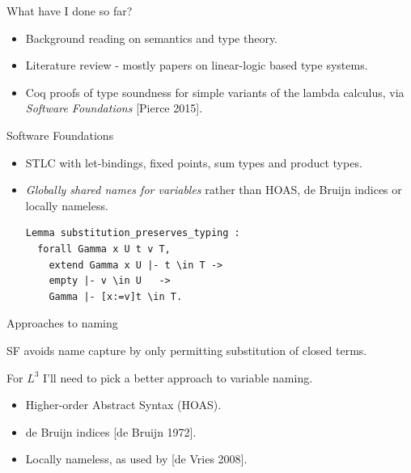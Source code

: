 \documentclass[10pt]{beamer}
\begin{document}
\begin{frame}{What have I done so far?}

\begin{itemize}
\item Background reading on semantics and type theory.
\item Literature review - mostly papers on linear-logic based type systems.
\item Coq proofs of type soundness for simple variants of the lambda calculus, via \textit{Software Foundations} [Pierce 2015].
\end{itemize}
\end{frame}

\begin{frame}[fragile]{Software Foundations}

\begin{itemize}
\item STLC with let-bindings, fixed points, sum types and product types.
\item \textit{Globally shared names for variables} rather than HOAS, de Bruijn indices or locally nameless.

\begin{verbatim}
Lemma substitution_preserves_typing :
  forall Gamma x U t v T,
    extend Gamma x U |- t \in T ->
    empty |- v \in U   ->
    Gamma |- [x:=v]t \in T.
\end{verbatim}

\end{itemize}
\end{frame}

\begin{frame}{Approaches to naming}

SF avoids name capture by only permitting substitution of closed terms.

For $L^3$ I'll need to pick a better approach to variable naming.

\begin{itemize}
\item Higher-order Abstract Syntax (HOAS).
\item de Bruijn indices [de Bruijn 1972].
\item Locally nameless, as used by [de Vries 2008].
\end{itemize}
\end{frame}
\end{document}
